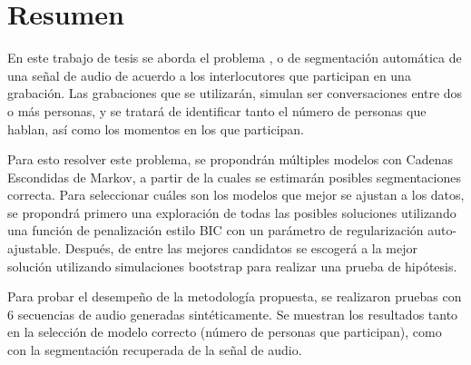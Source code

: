 \begingroup
\let\clearpage\relax
\let\cleardoublepage\relax
\let\cleardoublepage\relax

\chapter*{Resumen}
En este trabajo de tesis se aborda el problema \SD, o de segmentación automática de una señal de audio de acuerdo a los interlocutores que participan en una grabación. Las grabaciones que se utilizarán, simulan ser conversaciones entre dos o más personas, y se tratará de identificar tanto el número de personas que hablan, así como los momentos en los que participan. 

Para esto resolver este problema, se propondrán múltiples modelos con Cadenas Escondidas de Markov, a partir de la cuales se estimarán posibles segmentaciones correcta. Para seleccionar cuáles son los modelos que mejor se ajustan a los datos, se propondrá primero una exploración de todas las posibles soluciones utilizando una función de penalización estilo \ac{BIC} con un parámetro de regularización auto-ajustable. Después, de entre las mejores candidatos se escogerá a la mejor solución utilizando simulaciones bootstrap para realizar una prueba de hipótesis.

Para probar el desempeño de la metodología propuesta, se realizaron pruebas con 6 secuencias de audio generadas sintéticamente. Se muestran los resultados tanto en la selección de modelo correcto (número de personas que participan), como con la segmentación recuperada de la señal de audio.
\vfill
\endgroup			

\vfill
